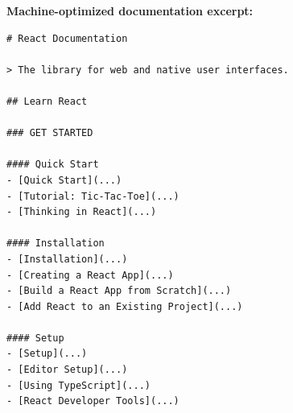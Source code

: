 \documentclass[10pt,conference,a4paper]{IEEEtran}
\begin{document}
\textbf{Machine-optimized documentation excerpt:}
{\tiny
\begin{verbatim}
# React Documentation

> The library for web and native user interfaces.

## Learn React

### GET STARTED

#### Quick Start
- [Quick Start](...)
- [Tutorial: Tic-Tac-Toe](...)
- [Thinking in React](...)

#### Installation
- [Installation](...)
- [Creating a React App](...)
- [Build a React App from Scratch](...)
- [Add React to an Existing Project](...)

#### Setup
- [Setup](...)
- [Editor Setup](...)
- [Using TypeScript](...)
- [React Developer Tools](...)
\end{verbatim}
}



\end{document}
